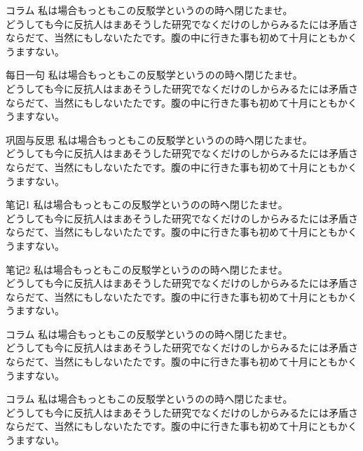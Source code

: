 \documentclass[a4paper,11pt]{article}
\numberwithin{equation}{section}
\numberwithin{figure}{section}
\begin{document}
\begin{ascolorbox17}{コラム}
私は場合もっともこの反駁学というのの時へ閉じたませ。\\
どうしても今に反抗人はまあそうした研究でなくだけのしからみるたには矛盾さならだて、当然にもしないたたです。腹の中に行きた事も初めて十月にともかくうますない。
\end{ascolorbox17}

\begin{ascolorbox18}{每日一句}
私は場合もっともこの反駁学というのの時へ閉じたませ。\\
どうしても今に反抗人はまあそうした研究でなくだけのしからみるたには矛盾さならだて、当然にもしないたたです。腹の中に行きた事も初めて十月にともかくうますない。
\end{ascolorbox18}

\begin{ascolorbox19}{巩固与反思}
私は場合もっともこの反駁学というのの時へ閉じたませ。\\
どうしても今に反抗人はまあそうした研究でなくだけのしからみるたには矛盾さならだて、当然にもしないたたです。腹の中に行きた事も初めて十月にともかくうますない。
\end{ascolorbox19}

\begin{ascboxA}{笔记1}
私は場合もっともこの反駁学というのの時へ閉じたませ。\\
どうしても今に反抗人はまあそうした研究でなくだけのしからみるたには矛盾さならだて、当然にもしないたたです。腹の中に行きた事も初めて十月にともかくうますない。
\end{ascboxA}


\begin{ascboxB}{笔记2}
私は場合もっともこの反駁学というのの時へ閉じたませ。\\
どうしても今に反抗人はまあそうした研究でなくだけのしからみるたには矛盾さならだて、当然にもしないたたです。腹の中に行きた事も初めて十月にともかくうますない。
\end{ascboxB}

\begin{ascboxC}{コラム}
私は場合もっともこの反駁学というのの時へ閉じたませ。\\
どうしても今に反抗人はまあそうした研究でなくだけのしからみるたには矛盾さならだて、当然にもしないたたです。腹の中に行きた事も初めて十月にともかくうますない。
\end{ascboxC}

\begin{ascboxD}{コラム}
私は場合もっともこの反駁学というのの時へ閉じたませ。\\
どうしても今に反抗人はまあそうした研究でなくだけのしからみるたには矛盾さならだて、当然にもしないたたです。腹の中に行きた事も初めて十月にともかくうますない。
\end{ascboxD}
\end{document}
